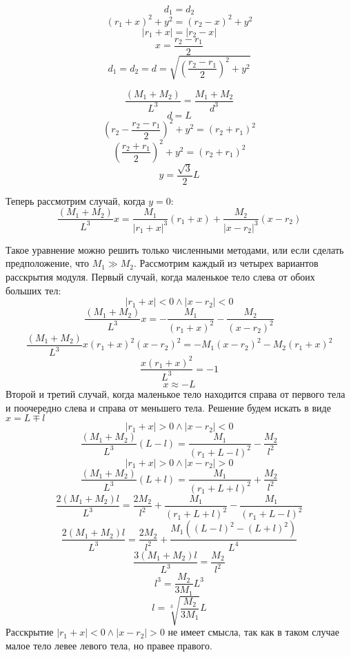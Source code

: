 \documentclass{article}
\begin{document}
    \[ d_1 = d_2 \]
    \[ (r_1 + x)^2 + y^2 = (r_2 - x)^2 + y^2\]
    \[ |r_1 + x| = |r_2 - x| \]
    \[ x = \frac{r_2 - r_1}{2} \]
    \[ d_1 = d_2 = d = \sqrt{ \left(\frac{r_2 - r_1}{2}\right)^2 + y^2} \]

    \[ \frac{\left( M_1 + M_2 \right) }{L^3} = \frac{M_1 + M_2}{d^3} \]
    \[ d = L \]
    \[ \left(r_2 - \frac{r_2 - r_1}{2}\right)^2 + y^2 = \left( r_2 + r_1 \right)^2 \]
    \[ \left(\frac{r_2 + r_1}{2}\right)^2 + y^2 = \left( r_2 + r_1 \right)^2 \]
    \[ y = \frac{\sqrt{3}}{2}L \]
    
    Теперь рассмотрим случай, когда $y = 0$:
    \[ \frac{\left( M_1 + M_2 \right) }{L^3} x =
       \frac{M_1}{|r_1 + x|^3} (r_1 + x) + \frac{M_2}{|x - r_2|^3} (x - r_2) \]

    Такое уравнение можно решить только численными методами, или если сделать предположение, что $M_1 \gg M_2$.
    Рассмотрим каждый из четырех вариантов расскрытия модуля.
    Первый случай, когда маленькое тело слева от обоих больших тел:
    \[ |r_1 + x| < 0 \land |x - r_2| < 0 \]
    \[ \frac{\left( M_1 + M_2 \right) }{L^3} x =
       -\frac{M_1}{(r_1 + x)^2} - \frac{M_2}{(x - r_2)^2} \]
    \[ \frac{\left( M_1 + M_2 \right) }{L^3} x (r_1 + x)^2 (x - r_2)^2 =
       - M_1 (x - r_2)^2 - M_2 (r_1 + x)^2 \]
    \[ \frac{x(r_1 + x)^2}{L^3} = -1 \]
    \[ x \approx -L \]
    Второй и третий случай, когда маленькое тело находится справа от первого тела и поочередно слева и справа от меньшего тела. Решение будем искать в виде $x = L \mp l$
    \[ |r_1 + x| > 0 \land |x - r_2| < 0 \]
    \[ \frac{\left( M_1 + M_2 \right) }{L^3} (L - l) =
       \frac{M_1}{(r_1 + L - l)^2} - \frac{M_2}{l^2} \]
    \[ |r_1 + x| > 0 \land |x - r_2| > 0 \]
    \[ \frac{\left( M_1 + M_2 \right) }{L^3} (L + l) =
       \frac{M_1}{(r_1 + L + l)^2} + \frac{M_2}{l^2} \]
    \[ \frac{2 \left( M_1 + M_2 \right) l}{L^3} = \frac{2M_2}{l^2} + \frac{M_1}{(r_1 + L + l)^2} - \frac{M_1}{(r_1 + L - l)^2} \]
    \[ \frac{2 \left( M_1 + M_2 \right) l}{L^3} = \frac{2M_2}{l^2} + \frac{M_1\left((L - l)^2 - (L + l)^2\right)}{L^4} \]
    \[ \frac{3 \left( M_1 + M_2 \right) l}{L^3} = \frac{M_2}{l^2} \]
    \[ l^3 = \frac{M_2}{3 M_1} L^3 \]
    \[ l = \sqrt[3]{\frac{M_2}{3 M_1}} L \]
    Расскрытие $|r_1 + x| < 0 \land |x - r_2| > 0$ не имеет смысла, так как в таком случае малое тело левее левого тела, но правее правого.
    
\end{document}
